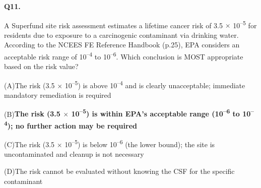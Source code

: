 \documentclass[11pt]{article}
\newcommand{\correct}[1]{\textbf{#1}\;{\color{accent}$\checkmark$}}
\newcommand{\optline}[2]{\par\noindent\hspace{1.2em}(#1)\hspace{0.6em}#2}
\begin{document}
\vspace{9pt}
\filbreak
\textbf{\color{accent}Q11.}\par\vspace{2pt}
A Superfund site risk assessment estimates a lifetime cancer risk of 3.5 $\times$ 10\textsuperscript{--}\textsuperscript{5} for residents due to exposure to a carcinogenic contaminant via drinking water. According to the NCEES FE Reference Handbook (p.25), EPA considers an acceptable risk range of 10\textsuperscript{--}\textsuperscript{4} to 10\textsuperscript{--}\textsuperscript{6}. Which conclusion is MOST appropriate based on the risk value?\par\vspace{3pt}
\optline{A}{The risk (3.5 $\times$ 10\textsuperscript{--}\textsuperscript{5}) is above 10\textsuperscript{--}\textsuperscript{4} and is clearly unacceptable; immediate mandatory remediation is required}
\optline{B}{\correct{The risk (3.5 $\times$ 10\textsuperscript{--}\textsuperscript{5}) is within EPA's acceptable range (10\textsuperscript{--}\textsuperscript{6} to 10\textsuperscript{--}\textsuperscript{4}); no further action may be required}}
\optline{C}{The risk (3.5 $\times$ 10\textsuperscript{--}\textsuperscript{5}) is below 10\textsuperscript{--}\textsuperscript{6} (the lower bound); the site is uncontaminated and cleanup is not necessary}
\optline{D}{The risk cannot be evaluated without knowing the CSF for the specific contaminant}
\par\vspace{3pt}
\end{document}
